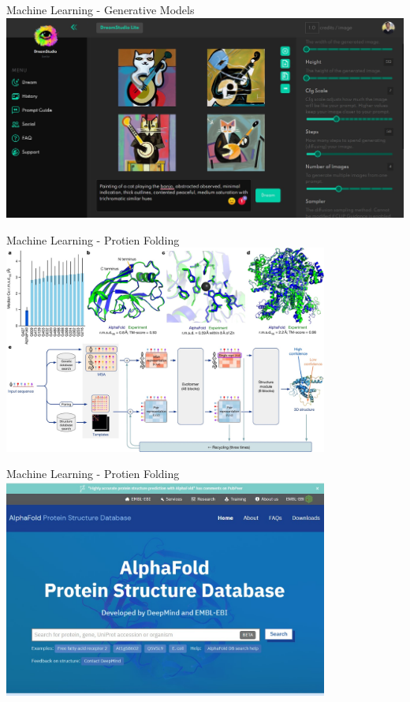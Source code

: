 \documentclass[aspectratio=169]{beamer}
\begin{document}
\begin{frame}{Machine Learning - Generative Models}
    \includegraphics[width=\textwidth]{imgs/vis_7.jpg}
\end{frame}


\begin{frame}{Machine Learning - Protien Folding}
    \centering
    \includegraphics[width=0.8\textwidth]{imgs/vis_9.jpg}
\end{frame}

\begin{frame}{Machine Learning - Protien Folding}
    \centering
    \includegraphics[width=0.8\textwidth]{imgs/vis_8.jpg}
\end{frame}
\end{document}
